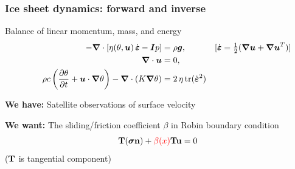 \documentclass[10pt,final,xcolor=dvipsnames]{beamer}
\newcommand{\gbf}[1]{\boldsymbol{#1}}
\newcommand{\bs}[1]{\ensuremath{\boldsymbol{#1}}}
\newcommand{\edot}{\dot{\gbf{\varepsilon}}}
\newcommand{\tcr}[1]{\ensuremath{\textcolor{red}{{#1}}}}
\begin{document}
\begin{frame}
\frametitle{Ice sheet dynamics: forward and inverse}

\begin{block}{Balance of linear momentum, mass, and energy}
  \[
  \begin{aligned}
    - \gbf{\nabla} \cdot \left[ \eta(\theta,\gbf{u}) \, \edot
      -\gbf{I}p \right] &= \rho \gbf{g},
    &[\edot = \tfrac 12  (\gbf{\nabla u} + \gbf{\nabla  u}^T)]
    \hspace{-2em}
    \\
    \gbf{\nabla} \cdot \gbf{u} &= 0,
    \vspace{-2em} \\
    \rho c \left(\frac{\partial \theta}{\partial t} + \gbf{u} \cdot \gbf{\nabla}
    \theta\right)  - \gbf{\nabla} \cdot (K \gbf{\nabla} \theta)
    &= 2 \, \eta \, \mathrm{tr}(\edot^2)
  \end{aligned}
  \]
\end{block}
\vspace{0.5cm}
\textbf{We have:} Satellite observations of surface velocity

\vspace{0.5cm}

\textbf{We want:} The sliding/friction coefficient $\beta$ in
Robin boundary condition
\begin{equation*}
{\bf T}(\bs \sigma {\bf n}) + \tcr{\beta (x)}{\bf T}{\bf u} = 0
\end{equation*}
($\bf T$ is tangential component)

\end{frame}
\end{document}
